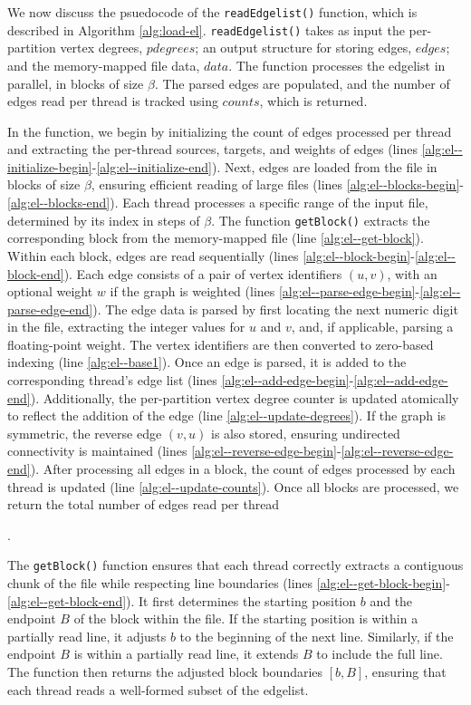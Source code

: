

We now discuss the psuedocode of the \texttt{readEdgelist()} function, which is described in Algorithm \ref{alg:load-el}. \texttt{readEdgelist()} takes as input the per-partition vertex degrees, $pdegrees$; an output structure for storing edges, $edges$; and the memory-mapped file data, $data$. The function processes the edgelist in parallel, in blocks of size $\beta$. The parsed edges are populated, and the number of edges read per thread is tracked using $counts$, which is returned.

In the function, we begin by initializing the count of edges processed per thread and extracting the per-thread sources, targets, and weights of edges (lines \ref{alg:el--initialize-begin}-\ref{alg:el--initialize-end}). Next, edges are loaded from the file in blocks of size $\beta$, ensuring efficient reading of large files (lines \ref{alg:el--blocks-begin}-\ref{alg:el--blocks-end}). Each thread processes a specific range of the input file, determined by its index in steps of $\beta$. The function \texttt{getBlock()} extracts the corresponding block from the memory-mapped file (line \ref{alg:el--get-block}). Within each block, edges are read sequentially (lines \ref{alg:el--block-begin}-\ref{alg:el--block-end}). Each edge consists of a pair of vertex identifiers $(u, v)$, with an optional weight $w$ if the graph is weighted (lines \ref{alg:el--parse-edge-begin}-\ref{alg:el--parse-edge-end}). The edge data is parsed by first locating the next numeric digit in the file, extracting the integer values for $u$ and $v$, and, if applicable, parsing a floating-point weight. The vertex identifiers are then converted to zero-based indexing (line \ref{alg:el--base1}). Once an edge is parsed, it is added to the corresponding thread's edge list (lines \ref{alg:el--add-edge-begin}-\ref{alg:el--add-edge-end}). Additionally, the per-partition vertex degree counter is updated atomically to reflect the addition of the edge (line \ref{alg:el--update-degrees}). If the graph is symmetric, the reverse edge $(v, u)$ is also stored, ensuring undirected connectivity is maintained (lines \ref{alg:el--reverse-edge-begin}-\ref{alg:el--reverse-edge-end}). After processing all edges in a block, the count of edges processed by each thread is updated (line \ref{alg:el--update-counts}). Once all blocks are processed, we return the total number of edges read per thread.

The \texttt{getBlock()} function ensures that each thread correctly extracts a contiguous chunk of the file while respecting line boundaries (lines \ref{alg:el--get-block-begin}-\ref{alg:el--get-block-end}). It first determines the starting position $b$ and the endpoint $B$ of the block within the file. If the starting position is within a partially read line, it adjusts $b$ to the beginning of the next line. Similarly, if the endpoint $B$ is within a partially read line, it extends $B$ to include the full line. The function then returns the adjusted block boundaries $[b, B]$, ensuring that each thread reads a well-formed subset of the edgelist.

